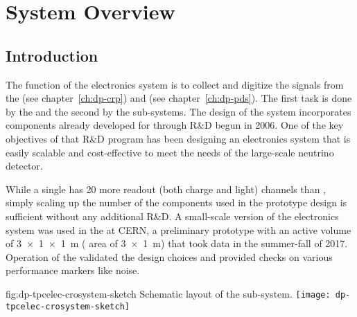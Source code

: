 \section{System Overview}
\label{sec:dp-tpcelec-overview}

\subsection{Introduction}
\label{ssec:dp-tpcelec-intro}


The function of the   electronics system is to collect and digitize the signals from the  (see chapter~\ref{ch:dp-crp}) and  (see chapter~\ref{ch:dp-pds}). The first task is done by the  and the second by the  sub-systems. The design of the system incorporates components already developed for  through R\&D begun in 2006. One of the key objectives of that R\&D program has been designing an electronics system that is easily scalable and cost-effective to meet the needs of the large-scale neutrino  detector. 

While a single  has \num{20} more readout (both charge and light) channels than , simply scaling up the number of the components used in the prototype design is sufficient without any additional R\&D. A small-scale version of the  electronics system was used in the  at CERN, a preliminary \dual \lartpc prototype with an active volume  of \SI[product-units=power]{3x1x1}{m} ( area of \SI[product-units=power]{3x1}{m}) that took data in the summer-fall of 2017. 
Operation of the  validated the design choices and provided checks on various performance markers like noise. 

\begin{dunefigure}{fig:dp-tpcelec-crosystem-sketch}
{Schematic layout of the   sub-system.}
\texttt{[image: dp-tpcelec-crosystem-sketch]}
\end{dunefigure}

